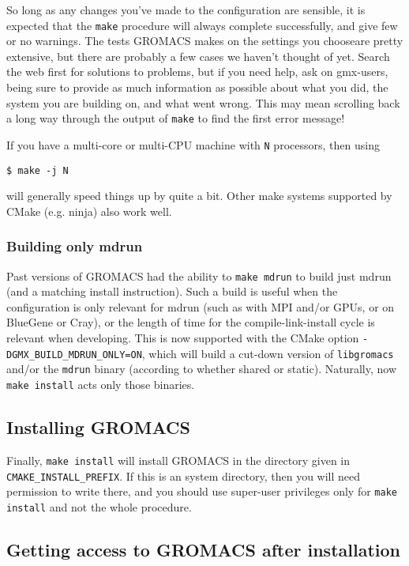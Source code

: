 \documentclass{article}[12pt,a4paper,twoside]
\newcommand{\gromacs}{GROMACS}
\newcommand{\mpi}{MPI}
\newcommand{\cmake}{CMake}
\begin{document}
\begin{enumerate}
So long as any changes you've made to the configuration are sensible,
it is expected that the \verb+make+ procedure will always complete
successfully, and give few or no warnings. The tests \gromacs{} makes
on the settings you chooseare pretty extensive, but there are probably
a few cases we haven't thought of yet. Search the web first for
solutions to problems, but if you need help, ask on gmx-users, being
sure to provide as much information as possible about what you did,
the system you are building on, and what went wrong. This may mean
scrolling back a long way through the output of \verb+make+ to find
the first error message!

If you have a multi-core or multi-CPU machine with \verb+N+
processors, then using
\begin{verbatim}
$ make -j N
\end{verbatim}
will generally speed things up by quite a bit. Other make systems
supported by \cmake{} (e.g. ninja) also work well.

\subsubsection{Building only mdrun}

Past versions of \gromacs{} had the ability to \verb+make mdrun+ to
build just mdrun (and a matching install instruction). Such a build is
useful when the configuration is only relevant for mdrun (such as with
\mpi{} and/or GPUs, or on BlueGene or Cray), or the length of time for
the compile-link-install cycle is relevant when developing. This is
now supported with the \cmake{} option
\verb+-DGMX_BUILD_MDRUN_ONLY=ON+, which will build a cut-down version
of \verb+libgromacs+ and/or the \verb+mdrun+ binary (according to
whether shared or static). Naturally, now \verb+make install+ acts
only those binaries.

\subsection{Installing \gromacs{}}

Finally, \verb+make install+ will install \gromacs{} in the
directory given in \verb+CMAKE_INSTALL_PREFIX+. If this is an system
directory, then you will need permission to write there, and you
should use super-user privileges only for \verb+make install+ and
not the whole procedure.

\subsection{Getting access to \gromacs{} after installation}


\end{enumerate}
\end{document}
